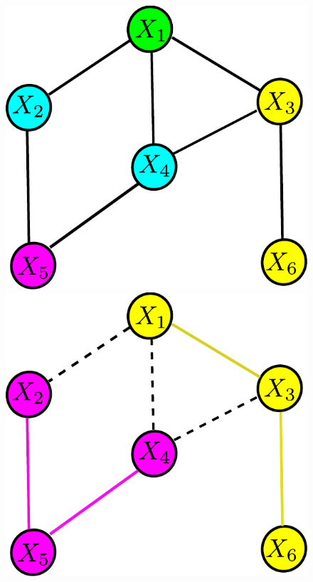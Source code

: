 \documentclass{article} %
\begin{document}
\begin{figure}
\begin{center}
\includegraphics[width=\gimgwidth]{figures/bg3} \hspace{\gimgspone}
\includegraphics[width=\gimgwidth]{figures/tree1} \hspace{\gimgsptwo}

\end{center}
\end{figure}
\end{document}
